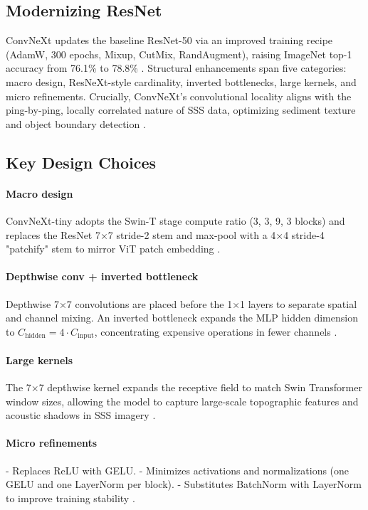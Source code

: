 \documentclass[12pt]{article}
\begin{document}
\subsection{Modernizing ResNet}

ConvNeXt updates the baseline ResNet-50 via an improved training recipe (AdamW, 300 epochs, Mixup, CutMix, RandAugment), raising ImageNet top-1 accuracy from 76.1\% to 78.8\% \cite{liu2022}. Structural enhancements span five categories: macro design, ResNeXt-style cardinality, inverted bottlenecks, large kernels, and micro refinements. Crucially, ConvNeXt's convolutional locality aligns with the ping-by-ping, locally correlated nature of SSS data, optimizing sediment texture and object boundary detection \cite{antoni2016, can2025_physdnet}.

\subsection{Key Design Choices}

\paragraph{Macro design}
ConvNeXt-tiny adopts the Swin-T stage compute ratio (3, 3, 9, 3 blocks) and replaces the ResNet 7×7 stride-2 stem and max-pool with a 4×4 stride-4 "patchify" stem to mirror ViT patch embedding \cite{liu2022}.

\paragraph{Depthwise conv + inverted bottleneck}
Depthwise 7×7 convolutions are placed before the 1×1 layers to separate spatial and channel mixing. An inverted bottleneck expands the MLP hidden dimension to $C_\text{hidden} = 4 \cdot C_\text{input}$, concentrating expensive operations in fewer channels \cite{liu2022}.

\paragraph{Large kernels}
The 7×7 depthwise kernel expands the receptive field to match Swin Transformer window sizes, allowing the model to capture large-scale topographic features and acoustic shadows in SSS imagery \cite{liu2022, can2025_sss}.

\paragraph{Micro refinements}
- Replaces ReLU with GELU.
- Minimizes activations and normalizations (one GELU and one LayerNorm per block).
- Substitutes BatchNorm with LayerNorm to improve training stability \cite{liu2022}.
\end{document}
